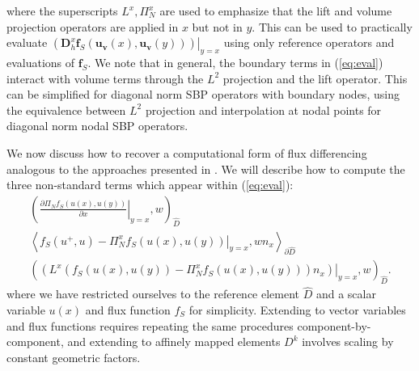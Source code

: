 \documentclass[preprint,10pt]{elsarticle}
\theoremstyle{definition}
\theoremstyle{lemma}
\theoremstyle{theorem}
\theoremstyle{assumption}
\newcommand{\pd}[2]{\frac{\partial#1}{\partial#2}}
\newcommand{\LRp}[1]{\left( #1 \right)}
\newcommand{\LRa}[1]{\left\langle #1 \right\rangle}
\begin{document}
where the superscripts $L^x, \Pi_N^x$ are used to emphasize that the lift and volume projection operators are applied in $x$ but not in $y$.  
This can be used to practically evaluate $\left.\LRp{\bm{D}^x_h \bm{f}_S(\bm{u}_{\bm{v}}(x),\bm{u}_{\bm{v}}(y))}\right|_{y=x}$ using only reference operators and evaluations of $\bm{f}_S$.  We note that in general, the boundary terms in (\ref{eq:eval}) interact with volume terms through the $L^2$ projection and the lift operator.  This can be simplified for diagonal norm SBP operators with boundary nodes, using the equivalence between $L^2$ projection and interpolation at nodal points for diagonal norm nodal SBP operators.  

We now discuss how to recover a computational form of flux differencing analogous to the approaches presented in \cite{gassner2016split, chen2017entropy}.  We will describe how to compute the three non-standard terms which appear within (\ref{eq:eval}):
\begin{align}
\LRp{\left.\pd{\Pi_N {f}_S({u}(x),{u}(y))}{x}\right|_{y=x},{w}}_{\widehat{D}}\label{eq:voleval}\\
\LRa{{f}_S({u}^+,{u})-\left.\Pi_N^x{f}_S({u}(x),{u}(y))\right|_{y=x},{w}{n}_x}_{\partial \widehat{D}}\label{eq:surfeval}\\
\LRp{\left.\LRp{L^x\LRp{{f}_S({u}(x),{u}(y)) - \Pi_N^x{f}_S({u}(x),{u}(y))}{n}_x}\right|_{y=x},{w}}_{\widehat{D}} \label{eq:volsurfeval}.
\end{align}
where we have restricted ourselves to the reference element $\widehat{D}$ and a scalar variable $u(x)$ and flux function $f_S$ for simplicity.  Extending to vector variables and flux functions requires repeating the same procedures component-by-component, and extending to affinely mapped elements $D^k$ involves scaling by constant geometric factors.  
\end{document}
